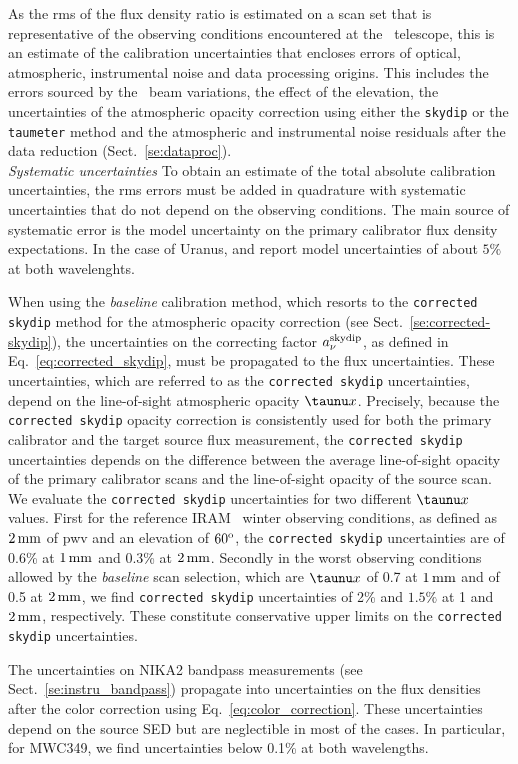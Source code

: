 {\lp As the rms of the flux density ratio is estimated on a scan set
that is representative of the observing conditions encountered at
the \trentemetre\ telescope, this is an estimate of the
calibration uncertainties that encloses errors of
optical, atmospheric, instrumental noise and data processing
origins. This includes the errors sourced by the \afternoon\ beam 
variations, the effect of the elevation, the uncertainties of the
atmospheric opacity correction using either the {\tt skydip} or
the {\tt taumeter} method and the atmospheric and instrumental noise
residuals after the data reduction (Sect.~\ref{se:dataproc}).\\

\noindent \emph{Systematic uncertainties} To obtain an estimate of the
total absolute calibration uncertainties, the rms errors must be added in quadrature
with systematic uncertainties that do not depend on the observing
conditions. The main source of systematic error is the model uncertainty
on the primary calibrator flux density expectations. In the case of
Uranus, \citet{Morenothesis} and \citet{Bendo2013} report model
uncertainties of about $5\%$ at both wavelenghts.

When using the \emph{baseline}
calibration method, which resorts to the {\tt corrected skydip} method
for the atmospheric opacity correction (see
Sect.~\ref{se:corrected-skydip}), the uncertainties on the
correcting factor $a_\nu^{\rm{skydip}}$, as defined in
Eq.~\ref{eq:corrected_skydip}, must be propagated to the flux
uncertainties. These uncertainties, which are referred to as the
{\tt corrected skydip} uncertainties, depend on the line-of-sight atmospheric
opacity $\taunu x$. Precisely, because the {\tt corrected skydip}
opacity correction is consistently used for both the primary
calibrator and the target source flux measurement, the {\tt corrected skydip}
uncertainties depends on the difference between the average
line-of-sight opacity of the primary calibrator scans and the
line-of-sight opacity of the source scan.   
We evaluate the {\tt corrected skydip} uncertainties for two
different $\taunu x$ values. First for the reference IRAM \trentemetre\
winter observing conditions, as defined as $2\,\rm{mm}$ of pwv and an
elevation of $60^{\rm{o}}$, the {\tt corrected skydip} uncertainties are of
0.6\% at $1\,\rm{mm}$ and 0.3\% at $2\,\rm{mm}$. Secondly in the worst
observing conditions allowed by the \emph{baseline} scan selection,
which are $\taunu x$ of 0.7 at $1\,\rm{mm}$ and of 0.5 at
$2\,\rm{mm}$, we find {\tt corrected skydip} uncertainties of 2\% and
$1.5\%$ at 1 and $2\,\rm{mm}$, respectively. These constitute
conservative upper limits on the {\tt corrected skydip}
uncertainties.

The uncertainties on NIKA2 bandpass measurements (see
Sect.~\ref{se:instru_bandpass}) propagate into
uncertainties on the flux densities after the color correction using
Eq.~\ref{eq:color_correction}. These
uncertainties depend on the source SED but are neglectible in most of
the cases. In particular, for MWC349, we find uncertainties below 0.1\% at
both wavelengths.}





